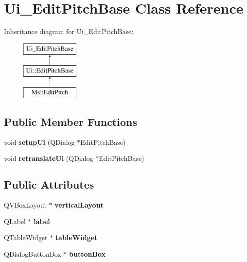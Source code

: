 \hypertarget{class_ui___edit_pitch_base}{}\section{Ui\+\_\+\+Edit\+Pitch\+Base Class Reference}
\label{class_ui___edit_pitch_base}
Inheritance diagram for Ui\+\_\+\+Edit\+Pitch\+Base\+:\begin{figure}[H]
\begin{center}
\leavevmode
\includegraphics[height=3.000000cm]{class_ui___edit_pitch_base}
\end{center}
\end{figure}
\subsection*{Public Member Functions}
\begin{DoxyCompactItemize}
\item 
\mbox{\label{class_ui___edit_pitch_base_af5dbae3a5bcee70cdc64d46a2e918701}} 
void {\bfseries setup\+Ui} (Q\+Dialog $\ast$Edit\+Pitch\+Base)
\item 
\mbox{\label{class_ui___edit_pitch_base_aaf90c0cf000b9c021b32531246feb50c}} 
void {\bfseries retranslate\+Ui} (Q\+Dialog $\ast$Edit\+Pitch\+Base)
\end{DoxyCompactItemize}
\subsection*{Public Attributes}
\begin{DoxyCompactItemize}
\item 
\mbox{\label{class_ui___edit_pitch_base_afcd5b4847e5f9eecc7b1b1e19fa87a5e}} 
Q\+V\+Box\+Layout $\ast$ {\bfseries vertical\+Layout}
\item 
\mbox{\label{class_ui___edit_pitch_base_ad0c400e9e798c0d18da5c3c0c1aca1b9}} 
Q\+Label $\ast$ {\bfseries label}
\item 
\mbox{\label{class_ui___edit_pitch_base_a6dce9b3de2be857540367d1833e549ed}} 
Q\+Table\+Widget $\ast$ {\bfseries table\+Widget}
\item 
\mbox{\label{class_ui___edit_pitch_base_a6c7825f31fd9bceea442da0dd3483ae8}} 
Q\+Dialog\+Button\+Box $\ast$ {\bfseries button\+Box}
\end{DoxyCompactItemize}



